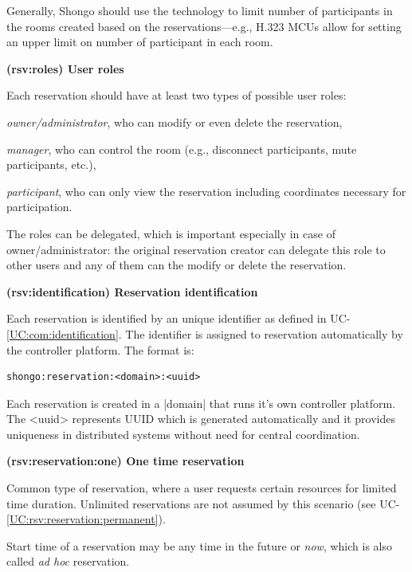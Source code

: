 \documentclass[a4paper]{report}
\makeatletter
\newcounter{UCcounter}
\newenvironment{UseCases}%
	{\begin{list}{\textbf{UC-\arabic{UCcounter}}}{\@nmbrlisttrue\def\@listctr{UCcounter}}}%
	{\end{list}}
\newcommand{\UClabel}[1]{\label{UC:#1}}
\newcommand{\UCref}[1]{UC-\ref{UC:#1}}
\newcommand{\UseCase}[2]{\item\UClabel{#2} \textbf{(#2) #1}\\ \nopagebreak}
\makeatother
\begin{document}
\begin{UseCases}
Generally, Shongo should use the technology to limit number of participants in
the rooms created based on the reservations---e.g., H.323 MCUs allow for
setting an upper limit on number of participant in each room.

\UseCase{User roles}{rsv:roles}

Each reservation should have at least two types of possible user roles:

\begin{compactitem}

\item \emph{owner/administrator}, who can modify or even delete the reservation,

\item \emph{manager}, who can control the room (e.g., disconnect participants, mute participants, etc.),

\item \emph{participant}, who can only view the reservation including coordinates necessary for participation.

\end{compactitem}

The roles can be delegated, which is important especially in case of owner/administrator: the original reservation creator can delegate this role to other users and any of them can the modify or delete the reservation.


\UseCase{Reservation identification}{rsv:identification}

Each reservation is identified by an unique identifier as defined in \UCref{com:identification}. The identifier is assigned to reservation automatically by the controller platform. The format is:
\begin{verbatim}
shongo:reservation:<domain>:<uuid>
\end{verbatim}
Each reservation is created in a |domain| that runs it's own controller platform.
The <uuid> represents UUID \cite{rfc4122} which is generated automatically and it provides uniqueness in distributed systems without need for central coordination.


\UseCase{One time reservation}{rsv:reservation:one}

Common type of reservation, where a user requests certain resources for limited
time duration. Unlimited reservations are not assumed by this scenario (see
\UCref{rsv:reservation:permanent}).

Start time of a reservation may be any time in the future or \emph{now}, which
is also called \emph{ad hoc} reservation.


\end{UseCases}
\end{document}
